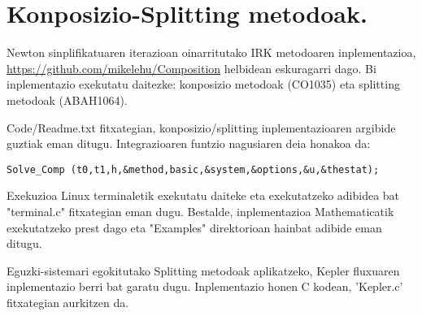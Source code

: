 \section{Konposizio-Splitting metodoak.}

Newton sinplifikatuaren iterazioan oinarritutako IRK metodoaren inplementazioa, \url{https://github.com/mikelehu/Composition} helbidean eskuragarri dago. Bi inplementazio exekutatu daitezke: konposizio metodoak (CO1035) eta splitting metodoak (ABAH1064).

Code/Readme.txt fitxategian, konposizio/splitting inplementazioaren argibide guztiak eman ditugu. Integrazioaren funtzio nagusiaren deia honakoa da:   
\begin{lstlisting}
Solve_Comp (t0,t1,h,&method,basic,&system,&options,&u,&thestat);
\end{lstlisting}

Exekuzioa Linux terminaletik exekutatu daiteke eta exekutatzeko adibidea bat  "terminal.c" fitxategian eman dugu. 
Bestalde, inplementazioa Mathematicatik exekutatzeko prest dago eta "Examples" direktorioan hainbat adibide eman ditugu. 

Eguzki-sistemari egokitutako Splitting metodoak aplikatzeko, Kepler fluxuaren inplementazio berri bat garatu dugu. Inplementazio honen C kodean, 'Kepler.c' fitxategian aurkitzen da. 
